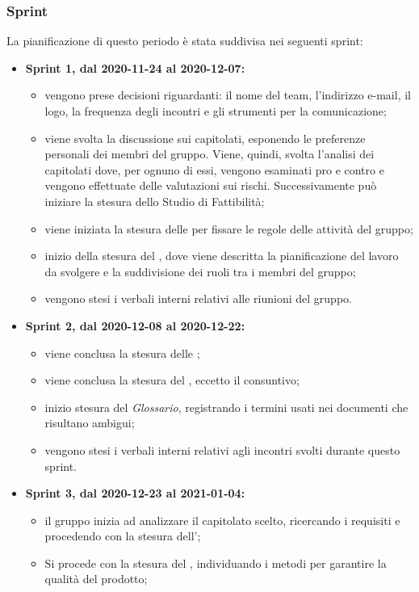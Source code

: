 \subsubsection{Sprint}
La pianificazione di questo periodo è stata suddivisa nei seguenti sprint:
\begin{itemize}
	\item \textbf{Sprint 1, dal 2020-11-24 al 2020-12-07:}
	\begin{itemize}
	\item vengono prese decisioni riguardanti: il nome del team, l'indirizzo e-mail, il logo, la frequenza degli incontri e gli strumenti per la comunicazione;
	\item viene svolta la discussione sui capitolati, esponendo le preferenze personali dei membri del gruppo. Viene, quindi, svolta l'analisi dei capitolati dove, per ognuno di essi, vengono esaminati pro e contro e vengono effettuate delle valutazioni sui rischi. Successivamente può iniziare la stesura dello Studio di Fattibilità;
	\item viene iniziata la stesura delle \NdP{} per fissare le regole delle attività del gruppo;
	\item inizio della stesura del \PdP{}, dove viene descritta la pianificazione del lavoro da svolgere e la suddivisione dei ruoli tra i membri del gruppo;
	\item vengono stesi i verbali interni relativi alle riunioni del gruppo.
	\end{itemize}
	\item \textbf{Sprint 2, dal 2020-12-08 al 2020-12-22:}
	\begin{itemize}
		\item viene conclusa la stesura delle \NdP{} ;
		\item viene conclusa la stesura del \PdP{}, eccetto il consuntivo;
		\item inizio stesura del \textit{Glossario}, registrando i termini usati nei documenti che risultano ambigui;
		\item vengono stesi i verbali interni relativi agli incontri svolti durante questo sprint.
	\end{itemize}
	\item \textbf{Sprint 3, dal 2020-12-23 al 2021-01-04:}
	\begin{itemize}
		\item il gruppo inizia ad analizzare il capitolato scelto, ricercando i requisiti e procedendo con la stesura dell'\AdR{};
		\item Si procede con la stesura del \PdQ{}, individuando i metodi per garantire la qualità del prodotto;

\end{itemize}
\end{itemize}
